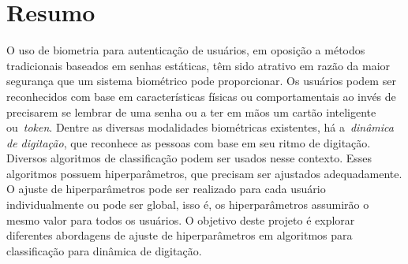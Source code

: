 \section*{Resumo}

O uso de biometria para autenticação de usuários, em oposição a métodos tradicionais baseados em senhas estáticas, têm sido atrativo em razão da maior segurança que um sistema biométrico pode proporcionar. Os usuários podem ser reconhecidos com base em características físicas ou comportamentais ao invés de precisarem se lembrar de uma senha ou a ter em mãos um cartão inteligente ou~\textit{token}. Dentre as diversas modalidades biométricas existentes, há a~\textit{dinâmica de digitação}, que reconhece as pessoas com base em seu ritmo de digitação. Diversos algoritmos de classificação podem ser usados nesse contexto. Esses algoritmos possuem hiperparâmetros, que precisam ser ajustados adequadamente. O ajuste de hiperparâmetros pode ser realizado para cada usuário individualmente ou pode ser global, isso é, os hiperparâmetros assumirão o mesmo valor para todos os usuários. O objetivo deste projeto é explorar diferentes abordagens de ajuste de hiperparâmetros em algoritmos para classificação para dinâmica de digitação.